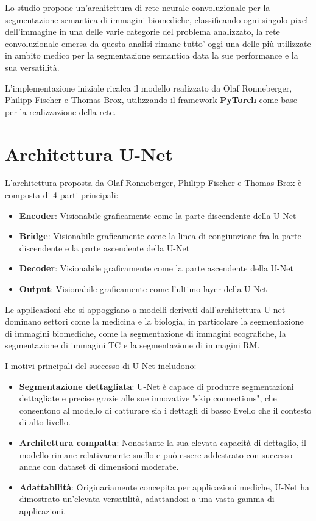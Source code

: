 Lo studio propone un'architettura di rete neurale convoluzionale per la
segmentazione semantica di immagini biomediche, classificando ogni singolo pixel
dell'immagine in una delle varie categorie del problema analizzato, la rete
convoluzionale emersa da questa analisi rimane tutto' oggi una delle più
utilizzate in ambito medico per la segmentazione semantica data la sue
performance e la sua versatilità.

L'implementazione iniziale ricalca il modello realizzato da Olaf Ronneberger,
Philipp Fischer e Thomas Brox, utilizzando il framework \textbf{PyTorch}
\cite{pytorch} come base per la realizzazione della rete.


\section{Architettura U-Net}

L'architettura proposta da Olaf Ronneberger, Philipp Fischer e Thomas Brox è
composta di 4 parti principali:
\begin{itemize}
	\item \textbf{Encoder}:
	      Visionabile graficamente come la parte discendente della U-Net
	\item \textbf{Bridge}: Visionabile graficamente come la linea di congiunzione fra la
	      parte discendente e la parte ascendente della U-Net
	\item \textbf{Decoder}: Visionabile graficamente come la parte ascendente della U-Net
	\item \textbf{Output}: Visionabile graficamente come l'ultimo layer della U-Net
\end{itemize}

Le applicazioni che si appoggiano a modelli derivati dall'architettura U-net
dominano settori come la medicina e la biologia, in particolare la segmentazione
di immagini biomediche, come la segmentazione di immagini ecografiche, la
segmentazione di immagini TC e la segmentazione di immagini RM.

I motivi principali del successo di U-Net includono:
\begin{itemize}
	\item \textbf{Segmentazione dettagliata}: U-Net è capace di produrre segmentazioni dettagliate e
	      precise grazie alle sue innovative "skip connections", che consentono al modello di
	      catturare sia i dettagli di basso livello che il contesto di alto livello.
	\item \textbf{Architettura compatta}: Nonostante la sua elevata capacità di dettaglio, il
	      modello rimane relativamente snello e può essere addestrato con successo anche con dataset
	      di dimensioni moderate.
	\item \textbf{Adattabilità}: Originariamente concepita per applicazioni mediche, U-Net ha
	      dimostrato un'elevata versatilità, adattandosi a una vasta gamma di applicazioni.
\end{itemize}

